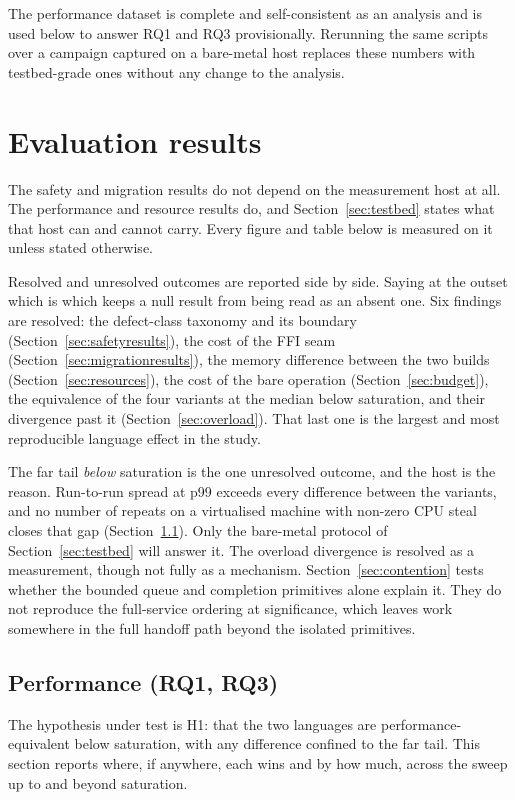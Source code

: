 \documentclass[english,oneside,a4paper,censored,csm,software-track-2020]{HYthesisML}
\begin{document}
The performance dataset is complete and self-consistent as an analysis and is used below to
answer RQ1 and RQ3 provisionally. Rerunning the same scripts over a campaign captured on a
bare-metal host replaces these numbers with testbed-grade ones without any change to the
analysis.

\section{Evaluation results}
The safety and migration results do not depend on the measurement host at all. The performance and
resource results do, and Section~\ref{sec:testbed} states what that host can and cannot carry.
Every figure and table below is measured on it unless stated otherwise.

Resolved and unresolved outcomes are reported side by side. Saying at the outset which is which
keeps a null result from being read as an absent one. Six findings are resolved: the
defect-class taxonomy and its boundary (Section~\ref{sec:safetyresults}), the cost of the FFI seam
(Section~\ref{sec:migrationresults}), the memory difference between the two builds
(Section~\ref{sec:resources}), the cost of the bare operation (Section~\ref{sec:budget}), the
equivalence of the four variants at the median below saturation, and their divergence past it
(Section~\ref{sec:overload}). That last one is the largest and most reproducible language effect
in the study.

The far tail \emph{below} saturation is the one unresolved outcome, and the host is the reason.
Run-to-run spread at p99 exceeds every difference between the variants, and no number of
repeats on a virtualised machine with non-zero CPU steal closes that gap
(Section~\ref{sec:perfresults}). Only the bare-metal protocol of Section~\ref{sec:testbed} will
answer it. The overload divergence is resolved as a measurement, though not fully as a mechanism.
Section~\ref{sec:contention} tests whether the bounded queue and completion primitives alone
explain it. They do not reproduce the full-service ordering at significance, which leaves
work somewhere in the full handoff path beyond the isolated primitives.

\subsection{Performance (RQ1, RQ3)}\label{sec:perfresults}
The hypothesis under test is H1: that the two languages are performance-equivalent below
saturation, with any difference confined to the far tail. This section reports where, if
anywhere, each wins and by how much, across the sweep up to and beyond saturation.
\end{document}
